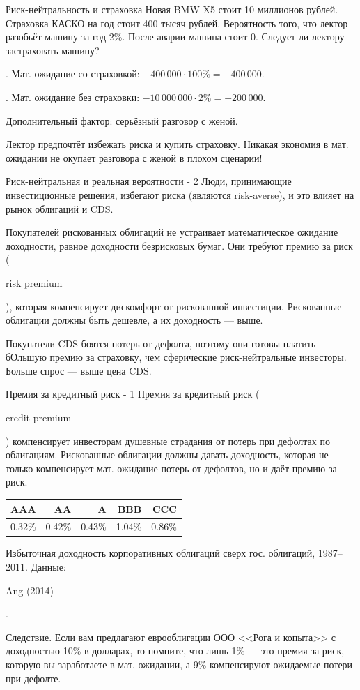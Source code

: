 \documentclass{beamer}
\newcommand{\en}[1]{\begin{otherlanguage}{english}#1\end{otherlanguage}}
\begin{document}
\begin{frame}{Риск-нейтральность и страховка}
\justify
Новая BMW X5 стоит 10 миллионов рублей. Страховка КАСКО на год стоит 400 тысяч рублей. Вероятность того, что лектор разобьёт машину за год 2\%. После аварии машина стоит 0. Следует ли лектору застраховать машину?

. Мат. ожидание со страховкой: $-400\,000 \cdot 100\% = -400\,000$.

. Мат. ожидание без страховки: $-10\,000\,000 \cdot 2\% = -200\,000$.

Дополнительный фактор: серьёзный разговор с женой.

\justify
Лектор предпочтёт избежать риска и купить страховку. Никакая экономия в мат. ожидании не окупает
разговора с женой в плохом сценарии!
\end{frame}



\begin{frame}{Риск-нейтральная и реальная вероятности - 2}
\justify
Люди, принимающие инвестиционные решения, избегают риска (являются risk-averse), и это влияет на рынок облигаций и CDS.

\justify
Покупателей рискованных облигаций не устраивает математическое ожидание доходности, равное доходности безрисковых бумаг. Они требуют \alert{премию за риск} (\en{risk premium}), которая компенсирует дискомфорт от рискованной инвестиции. Рискованные облигации должны быть дешевле, а их доходность --- выше.

\justify
Покупатели CDS боятся потерь от дефолта, поэтому они готовы платить бОльшую премию за страховку, чем сферические риск-нейтральные инвесторы. Больше спрос --- выше цена CDS.
\end{frame}



\begin{frame}{Премия за кредитный риск - 1}
\justify
Премия за кредитный риск (\en{credit premium}) компенсирует инвесторам душевные страдания от потерь при дефолтах по облигациям. Рискованные облигации должны
давать доходность, которая не только компенсирует мат. ожидание потерь от
дефолтов, но и даёт премию за риск.

\justify
\centering
\begin{tabular}{r|r|r|r|r}
AAA    & AA     & A      & BBB    & CCC \\ \hline
0.32\% & 0.42\% & 0.43\% & 1.04\% & 0.86\%  
\end{tabular}

\justify
\centering
{\scriptsize Избыточная доходность корпоративных облигаций сверх гос. 
облигаций, 1987--2011. Данные: \en{Ang (2014)}.}

\justify
Следствие. Если вам предлагают еврооблигации ООО <<Рога и копыта>> с 
доходностью 10\% в долларах, то помните, что лишь 1\% --- это премия за риск,
которую вы заработаете в мат. ожидании, а 9\% компенсируют ожидаемые
потери при дефолте.
\end{frame}
\end{document}
